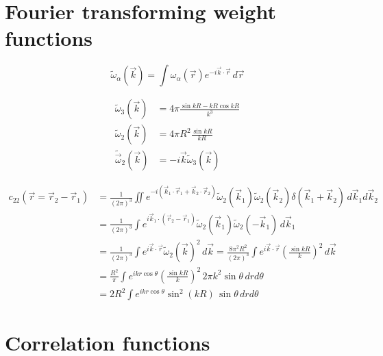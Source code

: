 \documentclass[12pt]{report}
\begin{document}
\section{Fourier transforming weight functions}

\begin{equation}
  \widetilde{\omega}_\alpha(\vec{k}) =
  \int \omega_\alpha (\vec{r}) e^{-i \vec{k}\cdot\vec{r}} \, d\vec{r}
\end{equation}

\begin{align}
  \widetilde{\omega}_3(\vec{k}) &=
  4\pi \frac{\sin{kR} - kR\cos{kR}}{k^3} \\
  \widetilde{\omega}_2(\vec{k}) &=
  4\pi R^2 \frac{\sin{kR}}{kR} \\
  \widetilde{\vec{\omega}}_2(\vec{k}) &=
  - i \vec{k} \widetilde{\omega}_3(\vec{k})
\end{align}

\begin{equation}
  \begin{aligned}
    c_{22}(\vec{r} = \vec{r}_2 - \vec{r}_1) &=
    \frac{1}{(2\pi)^3}
    \iint
    e^{-i (\vec{k}_1\cdot\vec{r}_1 + \vec{k}_2\cdot\vec{r}_2)}
    \widetilde{\omega}_2(\vec{k}_1)
    \widetilde{\omega}_2(\vec{k}_2)
    \delta{(\vec{k}_1 + \vec{k}_2)}
    \, d\vec{k}_1 d\vec{k}_2 \\
    &=
    \frac{1}{(2\pi)^3}
    \int
    e^{i \vec{k}_1 \cdot (\vec{r}_2 - \vec{r}_1)}
    \widetilde{\omega}_2(\vec{k}_1)
    \widetilde{\omega}_2(-\vec{k}_1)
    \, d\vec{k}_1 \\
    &=
    \frac{1}{(2\pi)^3}
    \int
    e^{i \vec{k} \cdot \vec{r}}
    \widetilde{\omega}_2(\vec{k})^2
    \, d\vec{k}
    =
    \frac{8\pi^2 R^2}{(2\pi)^3}
    \int
    e^{i \vec{k} \cdot \vec{r}}
    \left( \frac{\sin{kR}}{k} \right)^2
    \, d\vec{k} \\
    &=
    \frac{R^2}{\pi}
    \int
    e^{i k r \cos\theta}
    \left( \frac{\sin{kR}}{k} \right)^2
    \, 2\pi k^2 \sin\theta \, dr d\theta \\
    &=
    2 R^2
    \int
    e^{i k r \cos\theta}
    \sin^2{(kR)}
    \, \sin\theta \, dr d\theta
  \end{aligned}
\end{equation}

\section{Correlation functions}
\end{document}
